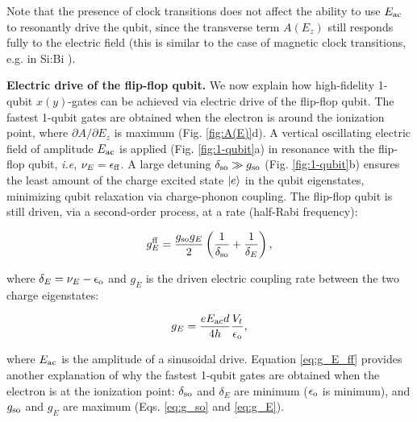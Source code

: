 \documentclass[aps,prb,superscriptaddress,nobibnotes,twocolumn]{revtex4-1}
\begin{document}
Note that the presence of clock transitions does not affect the ability to use $E_{\rm ac}$ to resonantly drive the qubit, since the transverse term $A(E_z)$ still responds fully to the electric field (this is similar to the case of magnetic clock transitions, e.g. in Si:Bi \cite{Wolfowicz2013}).


\vspace{3mm}
\noindent\textbf{Electric drive of the flip-flop qubit.}
%
We now explain how high-fidelity 1-qubit $x(y)$-gates can be achieved via electric drive of the flip-flop qubit. The fastest 1-qubit gates are obtained when the electron is around the ionization point, where $\partial A/\partial E_z$ is maximum (Fig. \ref{fig:A(E)}d). A vertical oscillating electric field of amplitude $E_{\rm ac}$ is applied (Fig. \ref{fig:1-qubit}a) in resonance with the flip-flop qubit, \textit{i.e}, $\nu_E=\epsilon_{\rm ff}$. A large detuning $\delta_{\rm so}\gg g_{\rm so}$ (Fig. \ref{fig:1-qubit}b) ensures the least amount of the charge excited state $\ket{e}$ in the qubit eigenstates, minimizing qubit relaxation via charge-phonon coupling. The flip-flop qubit is still driven, via a second-order process, at a rate (half-Rabi frequency):

\begin{equation} \label{eq:g_E_ff}
g^{\rm ff}_{E}=\frac{g_{\rm so}g_{E}}{2}\left(\frac{1}{\delta_{\rm so}}+\frac{1}{\delta_E}\right),
\end{equation}

where $\delta_E=\nu_E-\epsilon_{\rm o}$ and $g_{E}$ is the driven electric coupling rate between the two charge eigenstates:

\begin{equation} \label{eq:g_E}
g_{E}=\frac{e E_{\rm ac} d}{4h}\frac{V_t}{\epsilon_{\rm o}},
\end{equation}

where $E_{\rm ac}$ is the amplitude of a sinusoidal drive. Equation \ref{eq:g_E_ff} provides another explanation of why the fastest 1-qubit gates are obtained when the electron is at the ionization point: $\delta_{\rm so}$ and $\delta_E$ are minimum ($\epsilon_{\rm o}$ is minimum), and $g_{\rm so}$ and $g_E$ are maximum (Eqs. \ref{eq:g_so} and \ref{eq:g_E}).
\end{document}
